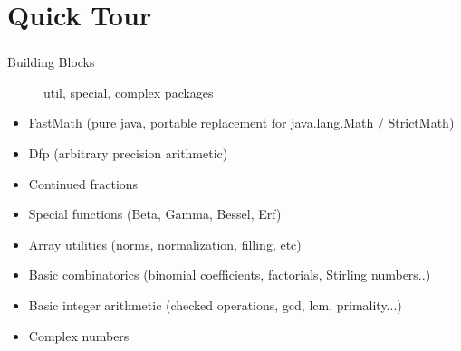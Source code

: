 \documentclass[14pt,mathserif]{beamer}
\begin{document}
\section[Overview]{Quick Tour}
\begin{frame}
  \frametitle{}

\begin{description}
  \item[Building Blocks] util, special, complex packages
\end{description}

\begin{small}
\begin{itemize}
  \item FastMath (pure java, portable replacement for java.lang.Math / StrictMath)
  \item Dfp (arbitrary precision arithmetic)
  \item Continued fractions
  \item Special functions (Beta, Gamma, Bessel, Erf)
  \item Array utilities (norms, normalization, filling, etc)
  \item Basic combinatorics (binomial coefficients, factorials, Stirling numbers..)
  \item Basic integer arithmetic (checked operations, gcd, lcm, primality...)
  \item Complex numbers
\end{itemize}
\end{small}
\end{frame}
\end{document}
